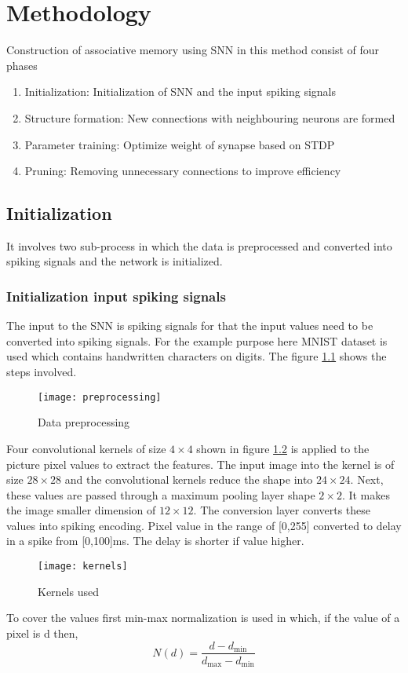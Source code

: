 \chapter{Methodology}

Construction of associative memory using SNN\cite{base} in this method consist
of four phases
\begin{enumerate}
    \itemsep0em
    \item Initialization: Initialization of SNN and the input spiking signals
    \item Structure formation: New connections with neighbouring neurons are formed
    \item Parameter training: Optimize weight of synapse based on STDP
    \item Pruning: Removing unnecessary connections to improve efficiency
\end{enumerate}
\section{Initialization}
It involves two sub-process in which the data is preprocessed and converted
into spiking signals and the network is initialized.
\subsection{Initialization input spiking signals}
The input to the SNN is spiking signals for that the input values need to be
converted into spiking signals. For the example purpose here MNIST dataset is
used which contains handwritten characters on digits. The figure
\ref{preprocessing} shows the steps involved.

\begin{figure}[h!]
    \centering
    \texttt{[image: preprocessing]}
    \caption{Data preprocessing}\label{preprocessing}
\end{figure}

Four convolutional kernels of size $4\times4$ shown in figure \ref{kernel} is
applied to the picture pixel values to extract the features. The input image
into the kernel is of size $28\times28$ and the convolutional kernels reduce
the shape into $24\times24$. Next, these values are passed through a maximum
pooling layer shape $2\times2$. It makes the image smaller dimension of
$12\times12$. The conversion layer converts these values into spiking encoding.
Pixel value in the range of [0,255] converted to delay in a spike from
    [0,100]ms. The delay is shorter if value higher.
\begin{figure}[h!]
    \centering
    \texttt{[image: kernels]}
    \caption{Kernels used}\label{kernel}
\end{figure}
To cover the values first min-max normalization is used in which, if
the value of a pixel is d then,
\begin{equation*}
    N(d)=\frac{d-d_{\min}}{d_{\max}-d_{\min}}
\end{equation*}

